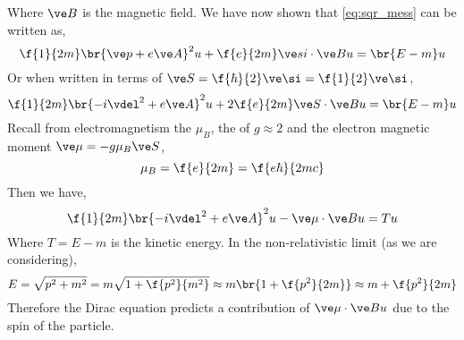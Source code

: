 \documentclass{article}
\begin{document}
Where $\ve B$ is the magnetic field. We have now shown that \cref{eq:sqr_mess} can be written as,
\[ \f{1}{2m} \br{\ve p + e \ve A}^{2} u + \f{e}{2m} \ve si \cdot \ve B u = \br{E - m}u \]
Or when written in terms of $\ve S = \f{\hbar}{2}\ve \si = \f{1}{2} \ve \si$,
\[ \f{1}{2m} \br{- i \vdel^2 + e \ve A}^{2} u + 2 \f{e}{2m} \ve S \cdot \ve B u = \br{E - m}u \]
Recall from electromagnetism the  $\mu_{B}$, the  of $g \approx 2$ and the electron magnetic moment $\ve \mu = -g \mu_B \ve S$,
\[ \mu_B = \f{e}{2m} = \f{e \hbar}{2 m c} \]
Then we have,
\[ \f{1}{2m} \br{- i \vdel^2 + e \ve A}^{2} u - \ve \mu \cdot \ve B u = Tu \]
Where $T = E -m$ is the kinetic energy. In the non-relativistic limit (as we are considering),
\[ E = \sqrt{p^2 + m^2} = m \sqrt{1 + \f{p^2}{m^2}} \approx m \br{1 + \f{p^2}{2m}} \approx m + \f{p^2}{2m} \]
Therefore the Dirac equation predicts a contribution of $\ve \mu \cdot \ve B u$ due to the spin of the particle. \\
\end{document}
